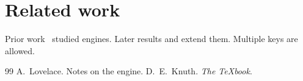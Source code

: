 \documentclass{article}
\begin{document}
\section{Related work}
Prior work~\cite{lovelace1843} studied engines. Later results
\citep[see][p.~3]{knuth1984} and \citet{hopper1952} extend them.
Multiple keys \cite{lovelace1843,missing2000} are allowed.

\begin{thebibliography}{99}
A.~Lovelace.
\newblock Notes on the engine.
D.~E.~Knuth.
\newblock \emph{The TeXbook}.
\end{thebibliography}
\end{document}
